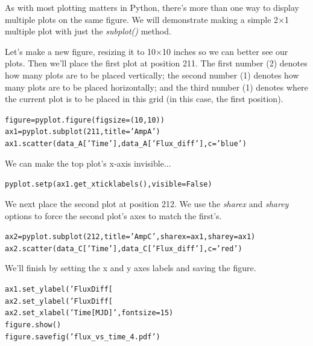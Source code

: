 As with most plotting matters in Python, there's more than one way to 
display multiple plots on the same figure. We will demonstrate making
a simple 2$\times$1 multiple plot with just the \textit{subplot()} method. 

Let's make a new figure, resizing it to 10$\times$10 inches so we can better see our plots.
Then we'll place the first plot at position 211. The first number (2) denotes 
how many plots are to be placed vertically; the second number (1) denotes
how many plots are to be placed horizontally; and the third number (1) denotes
where the current plot is to be placed in this grid (in this case, the first position). 

\begin{alltt}
\pytab figure = pyplot.figure(figsize = (10,10))
\pytab ax1 = pyplot.subplot(211, title='Amp A')
\pytab ax1.scatter(data_A['Time'], data_A['Flux_diff'], c='blue')
\end{alltt}

We can make the top plot's x-axis invisible... 

\begin{alltt}
\pytab pyplot.setp(ax1.get_xticklabels(), visible=False)
\end{alltt}

We next place the second plot at position 212. We use the \textit{sharex} and \textit{sharey} options
to force the second plot's  axes to match the first's.

\begin{alltt}
\pytab ax2 = pyplot.subplot(212, title='Amp C', sharex=ax1, sharey=ax1)
\pytab ax2.scatter(data_C['Time'], data_C['Flux_diff'], c='red')
\end{alltt}

We'll finish by setting the x and y axes labels and saving the figure.

\begin{alltt}
\pytab ax1.set_ylabel('Flux Diff [%
\pytab ax2.set_ylabel('Flux Diff [%
\pytab ax2.set_xlabel('Time [MJD]', fontsize=15)
\pytab figure.show()
\pytab figure.savefig('flux_vs_time_4.pdf')
\end{alltt}

